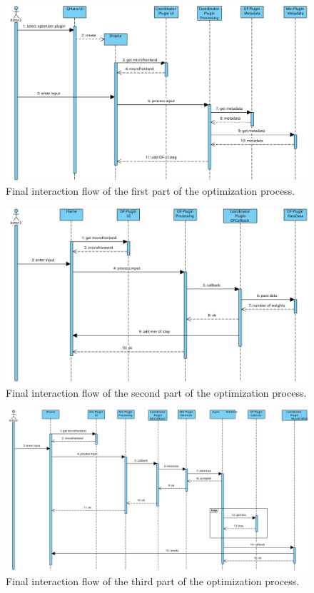 \documentclass[
  a4paper,  %
  twoside,  %
  bibliography=totoc,
  headsepline,
  cleardoublepage=empty,
  parskip=half,
  draft=false
]{scrbook}
\begin{document}
\begin{figure}[ht]
  \centering
  \includegraphics[width=\textwidth]{graphics/interaction_flow_1.svg}
  \caption{Final interaction flow of the first part of the optimization process.}
  \label{fig:interaction_flow_part1}
\end{figure}

\begin{figure}[ht]
  \centering
  \includegraphics[width=\textwidth]{graphics/interaction_flow_2.svg}
  \caption{Final interaction flow of the second part of the optimization process.}
  \label{fig:interaction_flow_part2}
\end{figure}

\begin{figure}[ht]
  \centering
  \includegraphics[width=\textwidth]{graphics/interaction_flow_3.svg}
  \caption{Final interaction flow of the third part of the optimization process.}
  \label{fig:interaction_flow_part3}
\end{figure}
\end{document}
